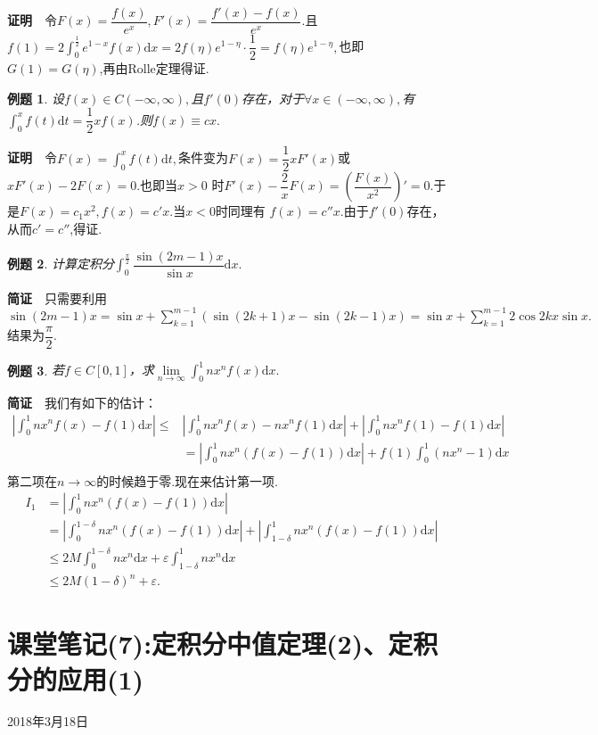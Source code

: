 \documentclass[UTF8]{article}
\newcommand{\dx}{\mathrm{d}x}
\newcommand{\zm}{\textbf{证明}$\quad$}
\newcommand{\jz}{\textbf{简证}$\quad$}
\newtheorem{exa}{\hspace{2em}例题}[section]
\begin{document}
\zm 令$F(x)=\dfrac{f(x)}{e^x},F'(x)=\dfrac{f'(x)-f(x)}{e^x}.$且$f(1)=2\displaystyle\int_0^\frac{1}{2}
e^{1-x}f(x)\dx=2f(\eta)e^{1-\eta}\cdot\dfrac{1}{2}=f(\eta)e^{1-\eta},$也即
$G(1)=G(\eta)$,再由Rolle定理得证.
\begin{exa}
  设$f(x)\in C(-\infty,\infty),$且$f'(0)$存在，对于$\forall x\in(-\infty,\infty),$有
  $\displaystyle\int_0^xf(t)\mathrm{d}t=\dfrac{1}{2}xf(x)$.则$f(x)\equiv cx.$
\end{exa}
\zm 令$F(x)=\int_0^xf(t)\mathrm{d}t,$条件变为$F(x)=\dfrac{1}{2}xF'(x)$或$xF'(x)-2F(x)=0$.也即当$x>0$
时$F'(x)-\dfrac{2}{x}F(x)=\left(\dfrac{F(x)}{x^2}\right)'=0.$于是$F(x)=c_1x^2,f(x)=c'x.$当$x<0$时同理有
$f(x)=c''x.$由于$f'(0)$存在，从而$c'=c''$,得证.

\begin{exa}
  计算定积分$\displaystyle\int_0^\frac{\pi}{2}\dfrac{\sin(2m-1)x}{\sin x}\dx.$
\end{exa}
\jz 只需要利用$\sin(2m-1)x=\sin x+\sum\limits_{k=1}^{m-1}(\sin(2k+1)x-\sin(2k-1)x)=\sin x+
\sum\limits_{k=1}^{m-1}2\cos2kx\sin x.$结果为$\dfrac{\pi}{2}$.
\begin{exa}
  若$f\in C[0,1]$，求$\lim\limits_{n\to\infty}\displaystyle\int_0^1nx^nf(x)\dx.$
\end{exa}
\jz 我们有如下的估计：
\begin{align*}
  \left|\int_0^1nx^nf(x)-f(1)\dx\right|\le&\left|\int_0^1nx^nf(x)-nx^nf(1)\dx\right|+
  \left|\int_0^1nx^nf(1)-f(1)\dx\right|\\
  &=\left|\int_0^1nx^n(f(x)-f(1))\dx\right|+f(1)\int_0^1(nx^n-1)\dx\\
\end{align*}
第二项在$n\to\infty$的时候趋于零.现在来估计第一项.\\
\begin{align*}
  I_1&=\left|\int_0^1nx^n(f(x)-f(1))\dx\right|\\
  &=\left|\int_0^{1-\delta}nx^n(f(x)-f(1))\dx\right|+\left|\int_{1-\delta}^1nx^n(f(x)-f(1))\dx\right|\\
  &\le2M\int_0^{1-\delta}nx^n\dx+\varepsilon\int_{1-\delta}^1nx^n\dx\\
  &\le 2M(1-\delta)^n+\varepsilon.
\end{align*}
\clearpage

\section{课堂笔记(7):定积分中值定理(2)、定积分的应用(1)}
\begin{center}
  2018年3月18日
\end{center}
\end{document}
